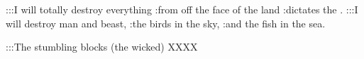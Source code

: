 
\begin{inparaenum}
   :::I will totally destroy everything :from off the face of the land :dictates the \lord.%
   :::I will destroy man and beast, :the birds in the sky, :and the fish in the sea.%
  
  :::The stumbling blocks (the wicked) XXXX%
  
\end{inparaenum}
